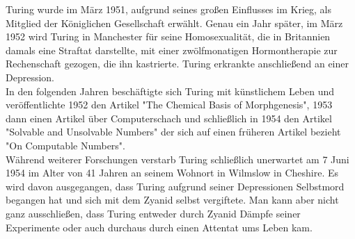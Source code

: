 Turing wurde im März 1951, aufgrund seines großen Einflusses im Krieg, als Mitglied der Königlichen Gesellschaft erwählt.
Genau ein Jahr später, im März 1952 wird Turing in Manchester für seine Homosexualität, die in Britannien damals eine Straftat darstellte, mit einer zwölfmonatigen Hormontherapie zur Rechenschaft gezogen, die ihn kastrierte. Turing erkrankte anschließend an einer Depression.\\
In den folgenden Jahren beschäftigte sich Turing mit künstlichem Leben und veröffentlichte 1952 den Artikel "The Chemical Basis of Morphgenesis", 1953 dann einen Artikel über Computerschach und schließlich in 1954 den Artikel "Solvable and Unsolvable Numbers" der sich auf einen früheren Artikel bezieht "On Computable Numbers".\\
Während weiterer Forschungen verstarb Turing schließlich unerwartet am 7 Juni 1954 im Alter von 41 Jahren an seinem Wohnort in Wilmslow in Cheshire. Es wird davon ausgegangen, dass Turing aufgrund seiner Depressionen Selbstmord begangen hat und sich mit dem Zyanid selbst vergiftete. Man kann aber nicht ganz ausschließen, dass Turing entweder durch Zyanid Dämpfe seiner Experimente oder auch durchaus durch einen Attentat ums Leben kam. 

